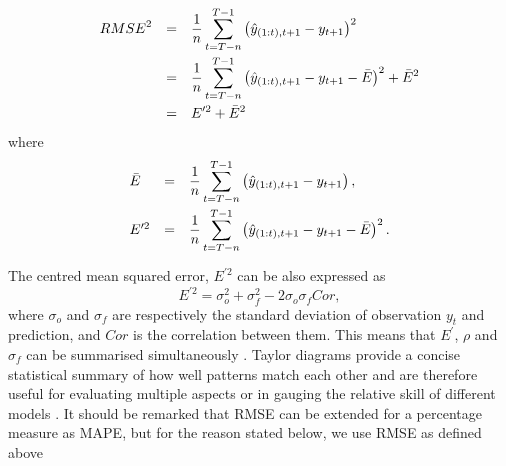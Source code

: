 \begin{equation}
\label{eqn:rmse2}
\begin{array}{lcl}
\vspace{0.1cm}
{RMSE}^2 &=& \disp \frac{1}{n} \sum_{t=T-n}^{T-1} \left( \hat{y}_{(1:t),t+1}-y_{t+1} \right)^2 \\
\vspace{0.1cm}
&=& \disp \frac{1}{n} \sum_{t=T-n}^{T-1} \left( \hat{y}_{(1:t),t+1}-y_{t+1} - \bar{E} \right)^2 + \bar{E}^2 \\
&=& \disp E^{\prime 2} + \bar{E}^2
\end{array}
\end{equation}
where 
\begin{equation}
\begin{array}{lcl}
\vspace{0.1cm}
\bar{E} &=& \disp \frac{1}{n} \sum_{t=T-n}^{T-1} \left( \hat{y}_{(1:t),t+1}-y_{t+1} \right), \\
\vspace{0.1cm}
E^{\prime 2} &=& \disp \frac{1}{n} \sum_{t=T-n}^{T-1} \left( \hat{y}_{(1:t),t+1}-y_{t+1} - \bar{E} \right)^2.
\end{array}
\end{equation}
The centred mean squared error, $E^{\prime 2}$ can be also expressed as 
\begin{equation}
E^{\prime 2} = \sigma_o^2 + \sigma_f^2 - 2\sigma_o \sigma_f Cor,
\end{equation}
where $\sigma_o$ and $\sigma_f$ are respectively the standard deviation of observation $y_t$ and prediction, and $Cor$ is the correlation between them. This means that $E^\prime$, $\rho$ and $\sigma_f$ can be summarised simultaneously \parencite{taylor2001summarizing}. Taylor diagrams provide a concise statistical summary of how well patterns match each other and are therefore useful for evaluating multiple aspects or in gauging the relative skill of different models \parencite{griggs2002climate}. It should be remarked that RMSE can be extended for a percentage measure as MAPE, but for the reason stated below, we use RMSE as defined above 

